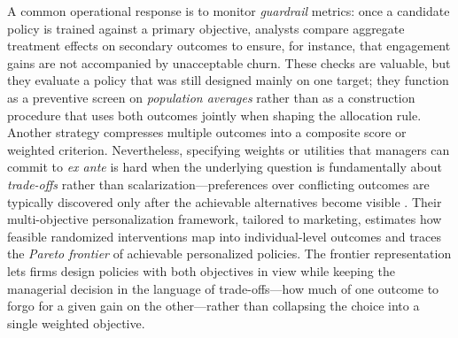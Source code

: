 \documentclass[11pt,letterpaper,english]{article}
\theoremstyle{definition}
\theoremstyle{definition}
\begin{document}
\begin{bibunit}
A common operational response is to monitor \emph{guardrail} metrics: once a candidate policy is trained against a primary objective, analysts compare aggregate treatment effects on secondary outcomes to ensure, for instance, that engagement gains are not accompanied by unacceptable churn. These checks are valuable, but they evaluate a policy that was still designed mainly on one target; they function as a preventive screen on \emph{population averages} rather than as a construction procedure that uses both outcomes jointly when shaping the allocation rule. Another strategy compresses multiple outcomes into a composite score or weighted criterion. Nevertheless, specifying weights or utilities that managers can commit to \emph{ex ante} is hard when the underlying question is fundamentally about \emph{trade-offs} rather than scalarization---preferences over conflicting outcomes are typically discovered only after the achievable alternatives become visible \citep{rafieian2025multiobjective}. Their multi-objective personalization framework, tailored to marketing, estimates how feasible randomized interventions map into individual-level outcomes and traces the \emph{Pareto frontier} of achievable personalized policies. The frontier representation lets firms design policies with both objectives in view while keeping the managerial decision in the language of trade-offs---how much of one outcome to forgo for a given gain on the other---rather than collapsing the choice into a single weighted objective.


\end{bibunit}
\end{document}
